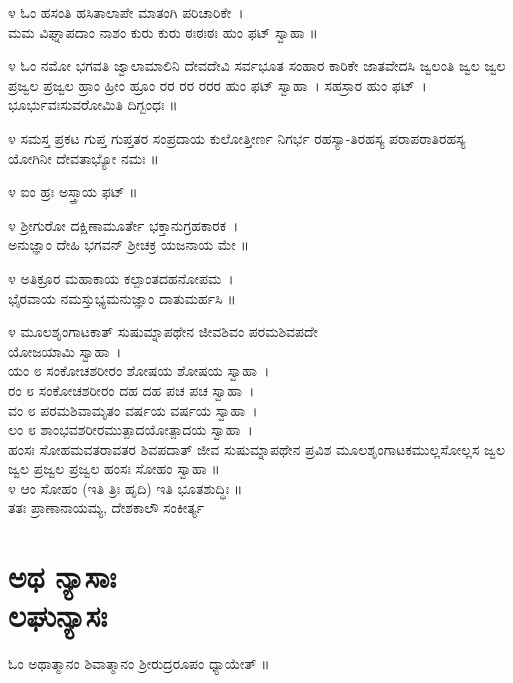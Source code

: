 ೪ ಓಂ ಹಸಂತಿ ಹಸಿತಾಲಾಪೇ ಮಾತಂಗಿ ಪರಿಚಾರಿಕೇ~।\\
ಮಮ ವಿಘ್ನಾಪದಾಂ ನಾಶಂ ಕುರು ಕುರು ಠಃಠಃಠಃ ಹುಂ ಫಟ್ ಸ್ವಾಹಾ ॥

೪ ಓಂ ನಮೋ ಭಗವತಿ ಜ್ವಾಲಾಮಾಲಿನಿ ದೇವದೇವಿ ಸರ್ವಭೂತ ಸಂಹಾರ ಕಾರಿಕೇ ಜಾತವೇದಸಿ ಜ್ವಲಂತಿ ಜ್ವಲ ಜ್ವಲ ಪ್ರಜ್ವಲ ಪ್ರಜ್ವಲ ಹ್ರಾಂ ಹ್ರೀಂ ಹ್ರೂಂ ರರ ರರ ರರರ ಹುಂ ಫಟ್ ಸ್ವಾಹಾ~। ಸಹಸ್ರಾರ ಹುಂ ಫಟ್~।\\ ಭೂರ್ಭುವಃಸುವರೋಮಿತಿ ದಿಗ್ಬಂಧಃ ॥

೪ ಸಮಸ್ತ ಪ್ರಕಟ ಗುಪ್ತ ಗುಪ್ತತರ ಸಂಪ್ರದಾಯ ಕುಲೋತ್ತೀರ್ಣ ನಿಗರ್ಭ ರಹಸ್ಯಾ-ತಿರಹಸ್ಯ ಪರಾಪರಾತಿರಹಸ್ಯ ಯೋಗಿನೀ ದೇವತಾಭ್ಯೋ ನಮಃ ॥

೪ ಐಂ ಹ್ರಃ ಅಸ್ತ್ರಾಯ ಫಟ್ ॥

೪ ಶ್ರೀಗುರೋ ದಕ್ಷಿಣಾಮೂರ್ತೇ ಭಕ್ತಾನುಗ್ರಹಕಾರಕ~।\\
ಅನುಜ್ಞಾಂ ದೇಹಿ ಭಗವನ್ ಶ್ರೀಚಕ್ರ ಯಜನಾಯ ಮೇ ॥

೪ ಅತಿಕ್ರೂರ ಮಹಾಕಾಯ ಕಲ್ಪಾಂತದಹನೋಪಮ~।\\
ಭೈರವಾಯ ನಮಸ್ತುಭ್ಯಮನುಜ್ಞಾಂ ದಾತುಮರ್ಹಸಿ ॥

೪ ಮೂಲಶೃಂಗಾಟಕಾತ್ ಸುಷುಮ್ನಾಪಥೇನ ಜೀವಶಿವಂ ಪರಮಶಿವಪದೇ \\ಯೋಜಯಾಮಿ ಸ್ವಾಹಾ~।\\
ಯಂ ೮ ಸಂಕೋಚಶರೀರಂ ಶೋಷಯ ಶೋಷಯ ಸ್ವಾಹಾ~।\\
ರಂ ೮ ಸಂಕೋಚಶರೀರಂ ದಹ ದಹ ಪಚ ಪಚ ಸ್ವಾಹಾ~।\\
ವಂ ೮ ಪರಮಶಿವಾಮೃತಂ ವರ್ಷಯ ವರ್ಷಯ ಸ್ವಾಹಾ~।\\
ಲಂ ೮ ಶಾಂಭವಶರೀರಮುತ್ಪಾದಯೋತ್ಪಾದಯ ಸ್ವಾಹಾ~।\\
ಹಂಸಃ ಸೋಹಮವತರಾವತರ ಶಿವಪದಾತ್ ಜೀವ ಸುಷುಮ್ನಾಪಥೇನ ಪ್ರವಿಶ ಮೂಲಶೃಂಗಾಟಕಮುಲ್ಲಸೋಲ್ಲಸ ಜ್ವಲ ಜ್ವಲ ಪ್ರಜ್ವಲ ಪ್ರಜ್ವಲ ಹಂಸಃ ಸೋಹಂ ಸ್ವಾಹಾ ॥\\
೪ ಆಂ ಸೋಹಂ (ಇತಿ ತ್ರಿಃ ಹೃದಿ) ಇತಿ ಭೂತಶುದ್ಧಿಃ ॥\\
ತತಃ ಪ್ರಾಣಾನಾಯಮ್ಯ, ದೇಶಕಾಲೌ ಸಂಕೀರ್ತ್ಯ 
\section{ ಅಥ ನ್ಯಾಸಾಃ\\ಲಘುನ್ಯಾಸಃ}
ಓಂ ಅಥಾತ್ಮಾನಂ ಶಿವಾತ್ಮಾನಂ ಶ್ರೀರುದ್ರರೂಪಂ ಧ್ಯಾಯೇತ್ ॥

